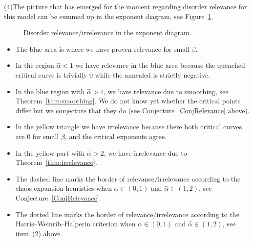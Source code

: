 \documentclass[10pt]{amsart}
\theoremstyle{definition}\newtheorem{defi}[theo]{Definition}\newtheorem{rema}[theo]{Remark}\newtheorem{exam}[theo]{Example}\newtheorem{exem}[theo]{Example}\newtheorem{nota}[theo]{Notation}
\newcommand{\ga}{\alpha}
\newcommand{\gb}{\beta}
\newcommand{\ha}{\hat\ga}
\begin{document}
\medskip
\noindent (4)\enskip The picture that has emerged for the moment regarding disorder relevance for this model can be summed up in the exponent diagram, see Figure~\ref{fig.sum}.
\begin{figure}
\begin{center}
\end{center}
\caption{\label{fig.sum}
Disorder relevance/irrelevance in the exponent diagram. }
\end{figure}
\begin{itemize}
\item The blue area is where we have proven relevance for small $\gb$.
\item In the region $\ha < 1$ we have relevance in the blue area because the quenched critical curve is trivially 0 while the annealed is strictly negative.
\item In the blue region with $\ha > 1$, we have relevance due to smoothing, see Theorem~\ref{thm:smoothing}. We do not know yet whether the critical points differ but we conjecture that they do (see Conjecture~\ref{ConjRelevance} above).
\item In the yellow triangle we have irrelevance because there both critical curves are 0 for small $\gb$, and the critical exponents agree.
\item In the yellow part with $\ha > 2$, we have irrelevance due to Theorem~\ref{thm:irrelevance}.
\item The dashed line marks the border of relevance/irrelevance according to the chaos expansion heuristics when $\ga\in(0,1)$ and $\ha\in(1,2)$, see Conjecture~\ref{ConjRelevance}.
\item The dotted line marks the border of relevance/irrelevance according to the Harris--Weinrib--Halperin criterion when $\ga\in(0,1)$ and $\ha\in(1,2)$, see item~(2) above.
\end{itemize}
\end{document}
